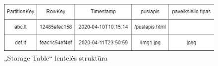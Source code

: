 \begin{figure}[htp!]
\hspace{-1cm}
\centering
\includegraphics[scale=0.7]{img/Storage_table.png}
\caption{„Storage Table“ lentelės struktūra \cite{TableStorageModel}}
\label{fig:storage_table_structure}
\end{figure}